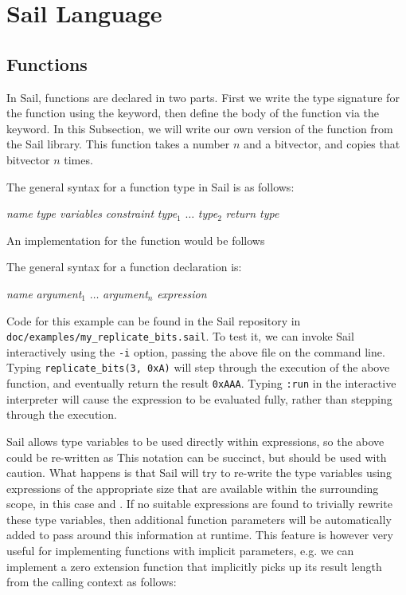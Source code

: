 \section{Sail Language}

\subsection{Functions}
\label{sec:functions}



In Sail, functions are declared in two parts. First we write the type
signature for the function using the  keyword, then define the
body of the function via the  keyword. In this
Subsection, we will write our own version of the 
function from the Sail library. This function takes a number $n$ and a
bitvector, and copies that bitvector $n$ times.

\mrbmyreplicatebits

\noindent The general syntax for a function type in Sail is as follows:
\begin{center}
   \textit{name} \ll{:}  \textit{type variables} \ll{,} \textit{constraint}  \textit{type$_1$} \ll{,} $\ldots$ \ll{,} \textit{type$_2$} \ll{)} \ll{->} \textit{return type}
\end{center}
An implementation for the  function would be
follows \mrbfnmyreplicatebits

The general syntax for a function declaration is:
\begin{center}
   \textit{name} \ll{(} \textit{argument$_1$} \ll{,} $\ldots$ \ll{,} \textit{argument$_n$} \ll{)} \ll{=} \textit{expression}
\end{center}

Code for this example can be found in
the Sail repository in \verb|doc/examples/my_replicate_bits.sail|. To
test it, we can invoke Sail interactively using the \verb|-i| option,
passing the above file on the command line. Typing
\verb|replicate_bits(3, 0xA)| will step through the execution of the
above function, and eventually return the result \verb|0xAAA|. Typing
\verb|:run| in the interactive interpreter will cause the expression
to be evaluated fully, rather than stepping through the execution.

Sail allows type variables to be used directly within expressions, so
the above could be re-written as \mrbfnmyreplicatebitstwo This
notation can be succinct, but should be used with caution. What
happens is that Sail will try to re-write the type variables using
expressions of the appropriate size that are available within the
surrounding scope, in this case  and . If no
suitable expressions are found to trivially rewrite these type
variables, then additional function parameters will be automatically
added to pass around this information at runtime. This feature is
however very useful for implementing functions with implicit
parameters, e.g. we can implement a zero extension function that
implicitly picks up its result length from the calling context as
follows:
\mrbextzz
\mrbfnextzz

